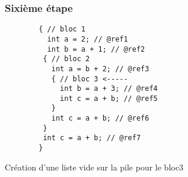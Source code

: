 \documentclass{../../res/univ-projet}
\begin{document}
    \subsubsection{Sixième étape}
    \begin{multicols}{2}
        
        \begin{verbatim}
        { // bloc 1
          int a = 2; // @ref1
          int b = a + 1; // @ref2
         { // bloc 2 
           int a = b + 2; // @ref3
           { // bloc 3 <-----
             int b = a + 3; // @ref4
             int c = a + b; // @ref5
           }
           int c = a + b; // @ref6
         }
         int c = a + b; // @ref7
        }

        \end{verbatim}

      \columnbreak
        Création d'une liste vide sur la pile pour le bloc3
        
      \end{multicols}
\end{document}
